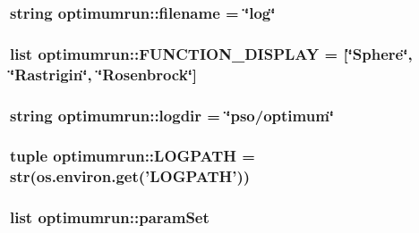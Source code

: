 \hypertarget{namespaceoptimumrun_d489d3dac609fb4e3cb33932e4a374b0}{
\subsubsection{\setlength{\rightskip}{0pt plus 5cm}string {\bf optimumrun::filename} = \char`\"{}log\char`\"{}}}
\label{namespaceoptimumrun_d489d3dac609fb4e3cb33932e4a374b0}


\hypertarget{namespaceoptimumrun_02d3cec80a2a645f1dd98a104b24d05c}{
\subsubsection{\setlength{\rightskip}{0pt plus 5cm}list {\bf optimumrun::FUNCTION\_\-DISPLAY} = \mbox{[}\char`\"{}Sphere\char`\"{}, \char`\"{}{\bf Rastrigin}\char`\"{}, \char`\"{}{\bf Rosenbrock}\char`\"{}\mbox{]}}}
\label{namespaceoptimumrun_02d3cec80a2a645f1dd98a104b24d05c}


\hypertarget{namespaceoptimumrun_1077a336221cd31215c741364700f553}{
\subsubsection{\setlength{\rightskip}{0pt plus 5cm}string {\bf optimumrun::logdir} = \char`\"{}pso/optimum\char`\"{}}}
\label{namespaceoptimumrun_1077a336221cd31215c741364700f553}


\hypertarget{namespaceoptimumrun_6f73020a092a3918b532338ceb8ddb73}{
\subsubsection{\setlength{\rightskip}{0pt plus 5cm}tuple {\bf optimumrun::LOGPATH} = str(os.environ.get('{\bf LOGPATH}'))}}
\label{namespaceoptimumrun_6f73020a092a3918b532338ceb8ddb73}


\hypertarget{namespaceoptimumrun_102b87c839f6e57588aa7b8a880e1621}{
\subsubsection{\setlength{\rightskip}{0pt plus 5cm}list {\bf optimumrun::paramSet}}}
\label{namespaceoptimumrun_102b87c839f6e57588aa7b8a880e1621}


